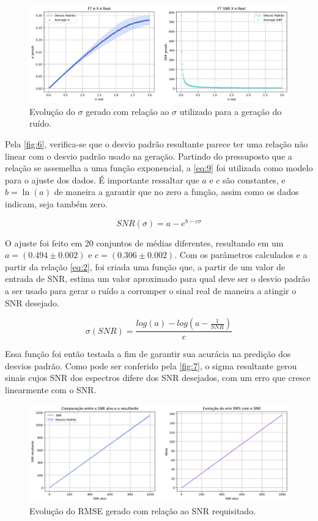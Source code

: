 \documentclass{article}
\begin{document}
\begin{figure} [H]
    \includegraphics[scale=0.37]{evolucao-sigmas.png}
    \centering
    \caption{Evolução do $\sigma$ gerado com relação ao $\sigma$ utilizado para a geração do ruído.}
    \label{fig:6}
\end{figure}

Pela \autoref{fig:6}, verifica-se que o desvio padrão resultante parece ter uma relação não linear com o desvio padrão usado na geração. Partindo do pressuposto que a relação se assemelha a uma função exponencial, a \autoref{eq:9} foi utilizada como modelo para o ajuste dos dados. É importante ressaltar que 
$a$ e $c$ são constantes, e $b = \ln(a)$ de maneira a garantir que no zero a função, assim como os dados indicam, seja também zero.

\begin{equation} \label{eq:9}
    SNR(\sigma) = a - e^{b - c\sigma} 
\end{equation}

O ajuste foi feito em 20 conjuntos de médias diferentes, resultando em um $a = (0.494 \pm 0.002)$ e $c = (0.306 \pm 0.002)$. Com os parâmetros calculados e a partir da relação \autoref{eq:2}, foi criada uma função que, a partir de um valor de entrada de SNR, estima um valor aproximado para qual deve ser o desvio padrão a ser usado para 
gerar o ruído a corromper o sinal real de maneira a atingir o SNR desejado.

\begin{equation} \label{eq:10}
    \sigma (SNR) = \frac{log(a) - log(a - \frac{1}{SNR})}{c}
\end{equation}

Essa função foi então testada a fim de garantir sua acurácia na predição dos desvios padrão. Como pode ser conferido pela \autoref{fig:7}, o sigma resultante gerou sinais cujos SNR dos espectros difere dos SNR desejados, com um erro que cresce linearmente com o SNR.

\begin{figure} [H]
    \includegraphics[scale=0.4]{evolucao-rmse-errado.png}
    \centering
    \caption{Evolução do RMSE gerado com relação ao SNR requisitado.}
    \label{fig:10}
\end{figure}
\end{document}
